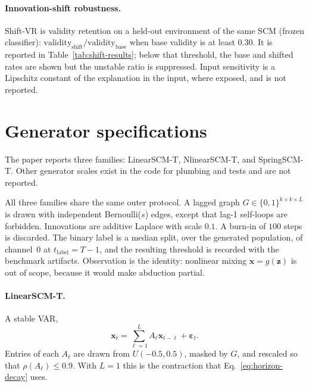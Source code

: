 \documentclass{article}
\newcommand{\bx}{\mathbf{x}}
\newcommand{\beps}{\boldsymbol{\varepsilon}}
\begin{document}
\paragraph{Innovation-shift robustness.}
Shift-VR is validity retention on a held-out environment of the same SCM (frozen classifier): $\mathrm{validity}_{\mathrm{shift}}/\mathrm{validity}_{\mathrm{base}}$ when base validity is at least $0.30$.  It is reported in Table~\ref{tab:shift-results}; below that threshold, the base and shifted rates are shown but the unstable ratio is suppressed.  Input sensitivity is a Lipschitz constant of the explanation in the input, where exposed, and is not reported.

\section{Generator specifications}
\label{app:generators}

The paper reports three families: LinearSCM-T, NlinearSCM-T, and SpringSCM-T.  Other generator scales exist in the code for plumbing and tests and are not reported.

All three families share the same outer protocol.  A lagged graph $G\in\{0,1\}^{k\times k\times L}$ is drawn with independent Bernoulli($s$) edges, except that lag-1 self-loops are forbidden.  Innovations are additive Laplace with scale $0.1$.  A burn-in of $100$ steps is discarded.  The binary label is a median split, over the generated population, of channel~$0$ at $t_{\mathrm{label}}=T-1$, and the resulting threshold is recorded with the benchmark artifacts.  Observation is the identity: nonlinear mixing $\bx=g(\mathbf{z})$ is out of scope, because it would make abduction partial.

\paragraph{LinearSCM-T.}
A stable VAR,
\begin{equation}
  \bx_t=\sum_{\ell=1}^{L}A_\ell \bx_{t-\ell}+\beps_t.
\end{equation}
Entries of each $A_\ell$ are drawn from $U(-0.5,0.5)$, masked by $G$, and rescaled so that $\rho(A_\ell)\le 0.9$.  With $L=1$ this is the contraction that Eq.~\eqref{eq:horizon-decay} uses.
\end{document}
